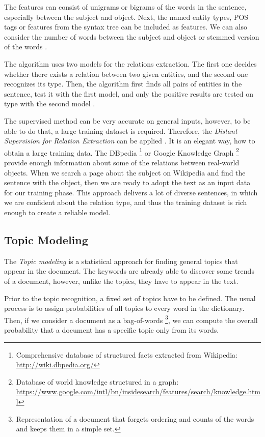 \documentclass[
  digital, %
  table,   %
  lof,     %
  lot,     %
]{fithesis3}
\begin{document}
The features can consist of unigrams or bigrams of the words in the sentence, especially between the subject and object. Next, the named entity types, POS tags or features from the syntax tree can be included as features. We can also consider the number of words between the subject and object or stemmed version of the words \cite[sec. 21.2]{jurafsky2014speech}.

The algorithm uses two models for the relations extraction.
The first one decides whether there exists a relation between two given entities, and the second one recognizes its type. Then, the algorithm first finds all pairs of entities in the sentence, test it with the first model, and only the positive results are tested on type with the second model \cite[sec. 21.2]{jurafsky2014speech}.

The supervised method can be very accurate on general inputs, however, to be able to do that, a large training dataset is required.
Therefore, the \textit{Distant Supervision for Relation Extraction} can be applied \cite{mintz2009distant}.
It is an elegant way, how to obtain a large training data.
The DBpedia \footnote{Comprehensive database of structured facts extracted from Wikipedia: \mbox{\url{http://wiki.dbpedia.org/}}} or 
Google Knowledge Graph \footnote{Database of world knowledge structured in a graph: \url{https://www.google.com/intl/bn/insidesearch/features/search/knowledge.html}}
provide enough information about some of the relations between real-world objects.
When we search a page about the subject on Wikipedia and find the sentence with the object, then we are ready to adopt the text as an input data for our training phase.
This approach delivers a lot of diverse sentences, in which we are confident about the relation type, and thus the training dataset is rich enough to create a reliable model.

\subsection{Topic Modeling}
\label{topic_modeling}
The \textit{Topic modeling} is a statistical approach for finding general topics that appear in the document.
The keywords are already able to discover some trends of a document, however, unlike the topics, they have to appear in the text.

Prior to the topic recognition, a fixed set of topics have to be defined.
The usual process is to assign probabilities of all topics to every word in the dictionary.
Then, if we consider a document as a bag-of-words
\footnote{Representation of a document that forgets ordering and counts of the words and keeps them in a simple set.}, 
we can compute the overall probability that a document has a specific topic only from its words.
\end{document}
